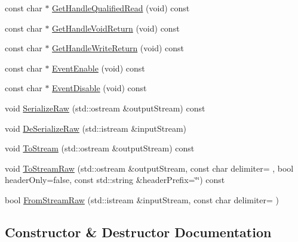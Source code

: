 \begin{DoxyCompactItemize}
const char $\ast$ \hyperlink{classmts_socket_proxy_init_data_a5ab57f3953b6de091c63a6ca9938fd7c}{Get\+Handle\+Qualified\+Read} (void) const 
\item 
const char $\ast$ \hyperlink{classmts_socket_proxy_init_data_a10997a33db140659d5342fa54a48c00f}{Get\+Handle\+Void\+Return} (void) const 
\item 
const char $\ast$ \hyperlink{classmts_socket_proxy_init_data_a275725fed4887b78a0aba466a968787c}{Get\+Handle\+Write\+Return} (void) const 
\item 
const char $\ast$ \hyperlink{classmts_socket_proxy_init_data_aec3c11f0166ba71ae93e0d6edc0bf898}{Event\+Enable} (void) const 
\item 
const char $\ast$ \hyperlink{classmts_socket_proxy_init_data_af80950fab397fcf91d036e3d6c339815}{Event\+Disable} (void) const 
\item 
void \hyperlink{classmts_socket_proxy_init_data_a6cf2b40afbe5a48d2103fda46168481f}{Serialize\+Raw} (std\+::ostream \&output\+Stream) const 
\item 
void \hyperlink{classmts_socket_proxy_init_data_a916a4e3c654ac542f35bb4f195bb228c}{De\+Serialize\+Raw} (std\+::istream \&input\+Stream)
\item 
void \hyperlink{classmts_socket_proxy_init_data_af13c18e35da0807eb3ea8eaa7fb7e55f}{To\+Stream} (std\+::ostream \&output\+Stream) const 
\item 
void \hyperlink{classmts_socket_proxy_init_data_acecfd3e87a2c5845f35cca56371c0e9c}{To\+Stream\+Raw} (std\+::ostream \&output\+Stream, const char delimiter= \textquotesingle{} \textquotesingle{}, bool header\+Only=false, const std\+::string \&header\+Prefix=\char`\"{}\char`\"{}) const 
\item 
bool \hyperlink{classmts_socket_proxy_init_data_a1455ba4dca0957c8712a42e0a7b00809}{From\+Stream\+Raw} (std\+::istream \&input\+Stream, const char delimiter= \textquotesingle{} \textquotesingle{})
\end{DoxyCompactItemize}


\subsection{Constructor \& Destructor Documentation}
\hypertarget{classmts_socket_proxy_init_data_a0fa824a91dbd7cdf2aad73ef02278b48}{}
